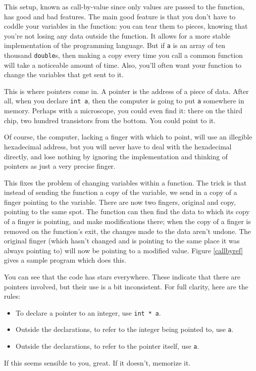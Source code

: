 \documentclass[12pt]{article}
\begin{document}
This setup, known as call-by-value since only values are passed to the
function, has good and bad features. The main good feature is that you
don't have to coddle your variables in the function: you can tear them to
pieces, knowing that you're not losing any data outside the function. It
allows for a more stable implementation of the programming language. But if {\tt a}
is an array of ten thousand {\tt double}s, then making a copy every time
you call a common function will take a noticeable amount of time. Also,
you'll often want your function to change the variables that get
sent to it.

This is where pointers come in. A pointer is the address of a piece of
data. After all, when you declare {\tt int a}, then the computer is
going to put {\tt a} somewhere in memory. Perhaps with a microscope,
you could even find it: there on the third chip, two hundred transistors
from the bottom. You could point to it.

Of course, the computer, lacking a finger with which to point, will use
an illegible hexadecimal address, but you will never have to deal with
the hexadecimal directly, and lose nothing by ignoring the implementation
and thinking of pointers as just a very precise finger.

This fixes the problem of changing variables within a function. The
trick is that instead of sending the function a copy of the variable,
we send in a copy of a finger pointing to the variable. There are now
two fingers, original and copy, pointing to the same spot. The
function can then find the data to which its copy of a finger is pointing,
and make modifications there; when the copy of a finger is removed on the
function's exit, the changes made to the data aren't undone.
The original finger (which hasn't changed and is pointing to the same
place it was always pointing to) will now be pointing to a modified value.
Figure \ref{callbyref} gives a sample program which does this.


You can see that the code has stars everywhere. These
indicate that there are pointers involved, but their use is a bit inconsistent.
For full clarity, here are the rules:
\begin{itemize}
\item To declare a pointer to an integer, use {\tt int * a}.
\item Outside the declarations, to refer to the integer being pointed to, use {\tt * a}.
\item Outside the declarations, to refer to the pointer itself, use {\tt a}.
\end{itemize}
If this seems sensible to you, great. If it doesn't, memorize it. 
\end{document}
